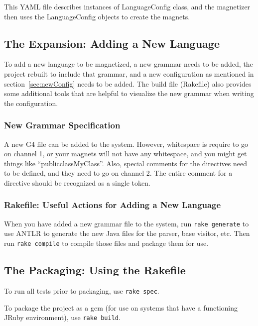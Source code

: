 \documentclass[letter,10pt,final]{article}
\begin{document}
This YAML file describes instances of LanguageConfig class, and the 
magnetizer then uses the LanguageConfig objects to create the magnets.



\subsection{The Expansion: Adding a New Language}
\label{sec:newLang}

To add a new language to be magnetized, a new grammar needs to be 
added, the project rebuilt to include that grammar, and a new 
configuration as mentioned in section~\ref{sec:newConfig} 
 needs to be added. The build file (Rakefile) 
also provides some additional tools that are helpful to visualize the 
new grammar when writing the configuration.

\subsubsection{New Grammar Specification}
A new G4 file can be added to the system. However, whitespace is
require to go on channel 1, or your magnets will not have any
whitespace, and you might get things like ``publicclassMyClass''. Also, 
special comments for the directives need to be defined, and they need 
to go on channel 2. The entire comment for a directive should be 
recognized as a single token.

\subsubsection{Rakefile: Useful Actions for Adding a New Language}
When you have added a new grammar file to the system, run 
\verb~rake generate~ to use ANTLR to generate the new Java files for 
the parser, base visitor, etc. Then run \verb~rake compile~ to compile 
those files and package them for use.

\subsection{The Packaging: Using the Rakefile}
To run all tests prior to packaging, use \verb~rake spec~.

To package the project as a gem (for use on systems that have a 
functioning JRuby environment), use \verb~rake build~. 
\end{document}
